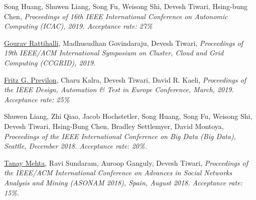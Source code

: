 {\textnormal{\newline Song Huang, Shuwen Liang, Song Fu, Weisong Shi, Devesh Tiwari, Hsing-bung Chen,}} {\textit{ Proceedings of 16th IEEE International Conference on Autonomic Computing (ICAC), 2019. Acceptance rate: 27\% \newline}}{}{}{} %

{\textnormal{\newline \underline{Gourav Rattihalli}, Madhusudhan Govindaraju, Devesh Tiwari,}} {\textit{ Proceedings of 19th IEEE/ACM International Symposium on Cluster, Cloud and Grid Computing (CCGRID), 2019.\newline}}{}{}{} 

{\textnormal{\newline \underline{Fritz G. Previlon}, Charu Kalra, Devesh Tiwari, David R. Kaeli,}} {\textit{Proceedings of the IEEE Design, Automation \& Test in Europe Conference, March, 2019. Acceptance rate: 25\% \newline \newline}}{}{}{} %




{\textnormal{\newline Shuwen Liang, Zhi Qiao, Jacob Hochstetler, Song Huang, Song Fu, Weisong Shi, Devesh Tiwari, Hsing-Bung Chen, Bradley Settlemyer, David Montoya, }} {\textit{Proceedings of the IEEE International Conference on Big Data (Big Data), Seattle, December 2018. Acceptance rate: 20\%.\newline}}{}{}{} %

{\textnormal{\newline \underline{Tanay Mehta}, Ravi Sundaram, Auroop Ganguly, Devesh Tiwari,}} {\textit{Proceedings of the IEEE/ACM International Conference on Advances in Social Networks Analysis and Mining (ASONAM 2018), Spain, August 2018. Acceptance rate: 15\%.\newline}}{}{}{} %


